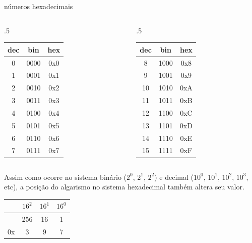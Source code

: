 \documentclass{beamer}
\begin{document}
\begin{frame}{números hexadecimais}
  \begin{columns}
    \begin{column}{.5\textwidth}
      \centering
      \begin{tabular}{ccc}
        \hline
        dec & bin & hex\\
        \hline
        0 & 0000 & {\color{orange} 0x}0\\
        1 & 0001 & {\color{orange} 0x}1\\
        2 & 0010 & {\color{orange} 0x}2\\
        3 & 0011 & {\color{orange} 0x}3\\
        4 & 0100 & {\color{orange} 0x}4\\
        5 & 0101 & {\color{orange} 0x}5\\
        6 & 0110 & {\color{orange} 0x}6\\
        7 & 0111 & {\color{orange} 0x}7\\
        \hline
      \end{tabular}
    \end{column}
    \begin{column}{.5\textwidth}
      \centering
      \begin{tabular}{ccc}
        \hline
        dec & bin & hex\\
        \hline
        8 & 1000 & {\color{orange} 0x}8\\
        9 & 1001 & {\color{orange} 0x}9\\
        10 & 1010 & {\color{orange} 0x}A\\
        11 & 1011 & {\color{orange} 0x}B\\
        12 & 1100 & {\color{orange} 0x}C\\
        13 & 1101 & {\color{orange} 0x}D\\
        14 & 1110 & {\color{orange} 0x}E\\
        15 & 1111 & {\color{orange} 0x}F\\
        \hline
      \end{tabular}
    \end{column}
  \end{columns}

  \framebreak

  Assim como ocorre no sistema binário ($2^0$, $2^1$, $2^2$) e decimal
  ($10^0$, $10^1$, $10^2$, $10^3$, etc), a posição do algarismo no
  sistema hexadecimal também altera seu valor.

  \begin{center}
    \renewcommand{\arraystretch}{1.5}
    \begin{tabular}{|l|c|c|c|}
      \hline
      & $16^2$ & $16^1$ & $16^0$ \\
      \hline
      & 256 & 16 & 1\\
      \hline
      0x & 3 & 9 & 7\\
      \hline
    \end{tabular}
  \end{center}


\end{frame}
\end{document}

